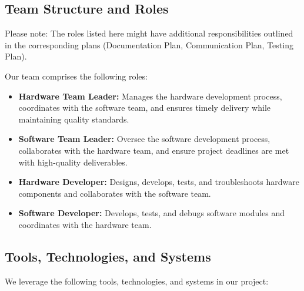 \documentclass[10pt]{projectdoc}
\begin{document}
\subsection{Team Structure and Roles}

Please note: The roles listed here might have additional responsibilities outlined in the corresponding plans (Documentation Plan, Communication Plan, Testing Plan).

Our team comprises the following roles:

\begin{itemize}
\item \textbf{Hardware Team Leader:} Manages the hardware development process, coordinates with the software team, and ensures timely delivery while maintaining quality standards.
\item \textbf{Software Team Leader:} Oversee the software development process, collaborates with the hardware team, and ensure project deadlines are met with high-quality deliverables.
\item \textbf{Hardware Developer:} Designs, develops, tests, and troubleshoots hardware components and collaborates with the software team.
\item \textbf{Software Developer:} Develops, tests, and debugs software modules and coordinates with the hardware team.
\end{itemize}

\subsection{Tools, Technologies, and Systems}

We leverage the following tools, technologies, and systems in our project:
\end{document}
